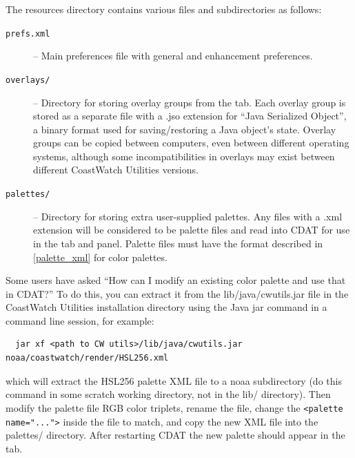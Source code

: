 The resources directory contains various files and subdirectories
as follows:
\begin{description}

\item[{\tt prefs.xml}] -- Main preferences file with general and
enhancement preferences.


\item[{\tt overlays/}] -- Directory for storing overlay groups
from the  tab.  Each overlay group
is stored as a separate file with a {\file .jso} extension for
``Java Serialized Object'', a binary format used for
saving/restoring a Java object's state.  Overlay groups can be
copied between computers, even between different operating
systems, although some incompatibilities in overlays may exist
between different CoastWatch Utilities versions.

\item[{\tt palettes/}] -- Directory for storing extra
user-supplied palettes.  Any files with a {\file .xml} extension
will be considered to be palette files and read into CDAT for use
in the  tab and
 panel.  Palette files must have
the format described in \autoref{palette_xml} for color palettes.

\end{description}

Some users have asked ``How can I modify an existing color
palette and use that in CDAT?''  To do this, you can extract it
from the {\file lib/java/cwutils.jar} file in the CoastWatch Utilities
installation directory using the Java jar command in a command
line session, for example:
\begin{verbatim}
  jar xf <path to CW utils>/lib/java/cwutils.jar noaa/coastwatch/render/HSL256.xml
\end{verbatim}
which will extract the HSL256 palette XML file to a {\file noaa}
subdirectory (do this command in some scratch working directory,
not in the {\file lib/} directory).  Then modify the palette file
RGB color triplets, rename the file, change the
\verb+<palette name="...">+ inside the file to match, and copy
the new XML file into the {\file palettes/} directory.  After
restarting CDAT the new palette should appear in the
 tab.

